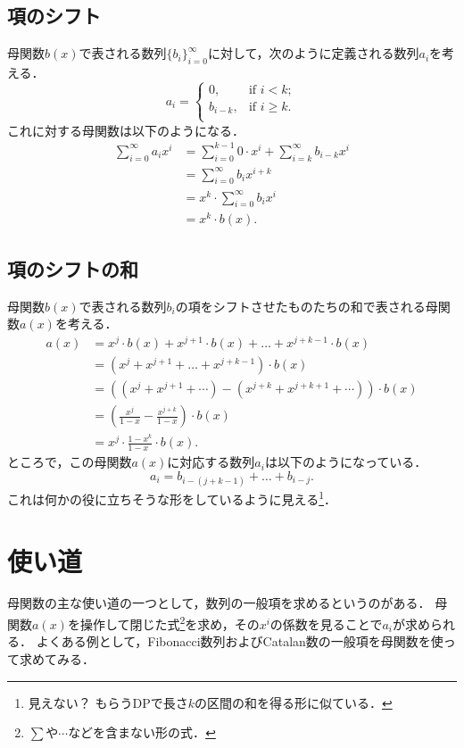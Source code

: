 \documentclass{jsarticle}
\begin{document}
\subsection{項のシフト}
母関数$b(x)$で表される数列$\{b_i\}_{i=0}^\infty$に対して，次のように定義される数列$a_i$を考える．
\[
a_i = \begin{cases}
  0, & \text{if }i < k;\\
  b_{i-k}, & \text{if }i \ge k.\\
\end{cases}
\]
これに対する母関数は以下のようになる．
\begin{align*}
  \sum_{i=0}^\infty a_i x^i
  &= \sum_{i=0}^{k-1} 0\cdot x^i + \sum_{i=k}^\infty b_{i-k} x^i\\
  &= \sum_{i=0}^\infty b_i x^{i+k}\\
  &= x^k\cdot \sum_{i=0}^\infty b_i x^i\\
  &= x^k\cdot b(x).
\end{align*}

\subsection{項のシフトの和}
母関数$b(x)$で表される数列$b_i$の項をシフトさせたものたちの和で表される母関数$a(x)$を考える．
\begin{align*}
  a(x) &= x^j\cdot b(x) + x^{j+1}\cdot b(x) + \dots + x^{j+k-1}\cdot b(x)\\
  &= \left(x^j + x^{j+1} + \dots + x^{j+k-1}\right)\cdot b(x)\\
  &= \left((x^j + x^{j+1} + \cdots) - (x^{j+k} + x^{j+k+1} + \cdots)\right)\cdot b(x)\\
  &= \left(\frac{x^j}{1-x} - \frac{x^{j+k}}{1-x}\right) \cdot b(x)\\
  &= x^j\cdot\frac{1-x^k}{1-x^{\phantom{1}}}\cdot b(x).
\end{align*}
ところで，この母関数$a(x)$に対応する数列$a_i$は以下のようになっている．
\[a_i = b_{i-(j+k-1)} + \dots + b_{i-j}.\]
これは何かの役に立ちそうな形をしているように見える\footnote{見えない？ もらうDPで長さ$k$の区間の和を得る形に似ている．}．

\section{使い道}
母関数の主な使い道の一つとして，数列の一般項を求めるというのがある．
母関数$a(x)$を操作して閉じた式\footnote{$\sum$や$\cdots$などを含まない形の式．}を求め，その$x^i$の係数を見ることで$a_i$が求められる．
よくある例として，Fibonacci数列およびCatalan\nobreak 数の一般項を母関数を使って求めてみる．
\end{document}
